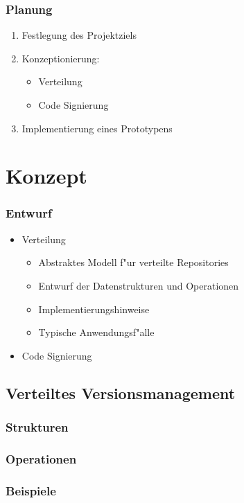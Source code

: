\documentclass[german]{beamer}
\begin{document}
\begin{frame}
  \frametitle{Planung}
  \begin{enumerate}
  \item Festlegung des Projektziels
  \item Konzeptionierung:
    \begin{itemize}
    \item Verteilung
    \item Code Signierung
    \end{itemize}
  \item Implementierung eines Prototypens
  \end{enumerate}
\end{frame}

\section{Konzept}

\begin{frame}
  \frametitle{Entwurf}
  \begin{itemize}
  \item Verteilung
    \begin{itemize}
    \item Abstraktes Modell f"ur verteilte Repositories
    \item Entwurf der Datenstrukturen und Operationen
    \item Implementierungshinweise
    \item Typische Anwendungsf"alle
    \end{itemize}
  \item Code Signierung
  \end{itemize}
\end{frame}

\subsection{Verteiltes Versionsmanagement}

\begin{frame}
  \frametitle{Strukturen}
  
\end{frame}

\begin{frame}
  \frametitle{Operationen}
  
\end{frame}

\begin{frame}
  \frametitle{Beispiele}

\end{frame}
\end{document}
